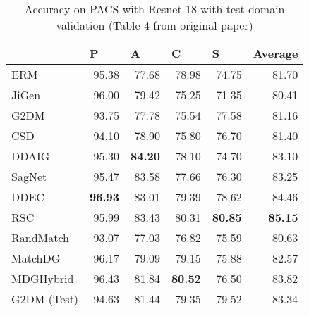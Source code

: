 \begin{table}[h]
\centering
\caption{\label{tab:table_4}Accuracy on PACS with Resnet 18 with test domain validation (Table 4 from original paper)}
\begin{tabular}{l|r|r|r|r|r}
\hline
                 & \multicolumn{1}{l|}{P} & \multicolumn{1}{l|}{A} & \multicolumn{1}{l|}{C} & \multicolumn{1}{l|}{S} & \multicolumn{1}{l}{Average} \\ \hline
ERM              & 95.38                  & 77.68                  & 78.98                  & 74.75                  & 81.70                       \\
JiGen            & 96.00                  & 79.42                  & 75.25                  & 71.35                  & 80.41                       \\
G2DM             & 93.75                  & 77.78                  & 75.54                  & 77.58                  & 81.16                       \\
CSD              & 94.10                  & 78.90                  & 75.80                  & 76.70                  & 81.40                       \\
DDAIG            & 95.30                  & \textbf{84.20}         & 78.10                  & 74.70                  & 83.10                       \\
SagNet           & 95.47                  & 83.58                  & 77.66                  & 76.30                  & 83.25                       \\
DDEC             & \textbf{96.93}         & 83.01                  & 79.39                  & 78.62                  & 84.46                       \\
RSC              & 95.99                  & 83.43                  & 80.31                  & \textbf{80.85}         & \textbf{85.15}              \\
RandMatch        & 93.07                  & 77.03                  & 76.82                  & 75.59                  & 80.63                       \\
MatchDG          & 96.17                  & 79.09                  & 79.15                  & 75.88                  & 82.57                       \\
MDGHybrid        & 96.43                  & 81.84                  & \textbf{80.52}         & 76.50                  & 83.82                       \\ \hline
G2DM (Test)      & 94.63                  & 81.44                  & 79.35                  & 79.52                  & 83.34                       \\

\end{tabular}
\end{table}
